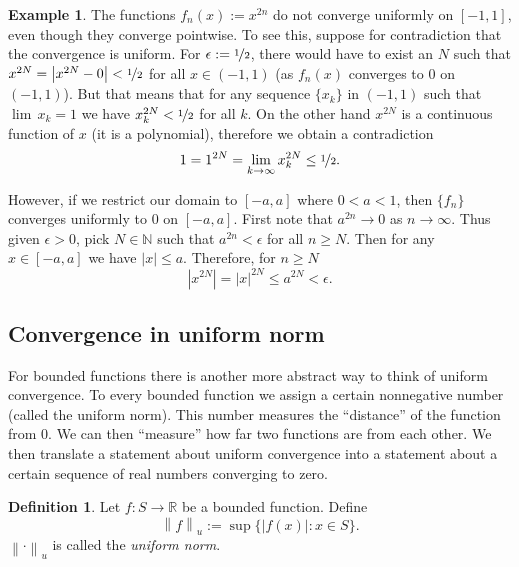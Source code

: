 \documentclass[12pt]{book}
\newcommand{\abs}[1]{\left\lvert {#1} \right\rvert}
\newcommand{\norm}[1]{\left\lVert {#1} \right\rVert}
\newcommand{\R}{{\mathbb{R}}}
\newcommand{\N}{{\mathbb{N}}}
\newcommand{\myindex}[1]{#1\index{#1}}
\theoremstyle{plain}
\theoremstyle{remark}
\theoremstyle{definition}
\newtheorem{defn}[thm]{Definition}
\theoremstyle{exercise}
\theoremstyle{example}
\newtheorem{example}[thm]{Example}
\begin{document}
\begin{example}
The functions $f_n(x) := x^{2n}$ do not converge uniformly on $[-1,1]$,
even though they converge pointwise.  To see this, suppose for contradiction
that the convergence is uniform.  For $\epsilon := \nicefrac{1}{2}$, there would have
to exist an $N$ such that $x^{2N} = \abs{x^{2N} - 0} < \nicefrac{1}{2}$ for all $x \in
(-1,1)$ (as $f_n(x)$ converges to 0 on $(-1,1)$).  But that means that
for any sequence $\{ x_k \}$ in $(-1,1)$ such that $\lim\, x_k = 1$
we have $x_k^{2N} < \nicefrac{1}{2}$ for all $k$.  On the other hand
$x^{2N}$ is a continuous function of $x$ (it is a polynomial), therefore
we obtain a contradiction
\begin{equation*}
1 = 1^{2N}  = \lim_{k\to\infty} x_k^{2N} \leq \nicefrac{1}{2} .
\end{equation*}

However, if we restrict our domain to $[-a,a]$ where $0 < a < 1$, then
$\{ f_n \}$ converges uniformly to 0 on $[-a,a]$.  First note
that $a^{2n} \to 0$ as $n \to \infty$.  Thus given $\epsilon > 0$,
pick $N \in \N$ such that
$a^{2n} < \epsilon$ for all $n \geq N$.  Then for any $x \in [-a,a]$
we have $\abs{x} \leq a$.  Therefore, for $n \geq N$
\begin{equation*}
\abs{x^{2N}} = \abs{x}^{2N} \leq a^{2N} < \epsilon .
\end{equation*}
\end{example}

\subsection{Convergence in uniform norm}

For bounded functions there is another more abstract way to 
think of uniform convergence.  To every bounded function we assign
a certain nonnegative number (called the uniform norm).  This number
measures the ``distance'' of the function from 0.  We can then ``measure''
how far two functions are from each other.  We then translate
a statement about uniform convergence into a statement about a certain
sequence of real numbers converging to zero.

\begin{defn} \label{def:unifnorm}
Let $f \colon S \to \R$ be a bounded function.  Define
\begin{equation*}
\norm{f}_u :=
\sup \bigl\{ \abs{f(x)} : x \in S \bigr\} .
\end{equation*}
$\norm{\cdot}_u$ is called the \emph{\myindex{uniform norm}}.
\end{defn}
\end{document}
